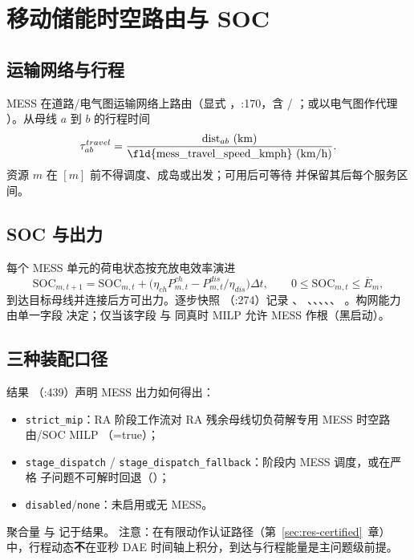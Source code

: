 \section{移动储能时空路由与 SOC}\label{sec:res-mess}

\subsection{运输网络与行程}
MESS 在道路/电气图运输网络上路由（显式 ，:170，含 /
；或以电气图作代理 ）。从母线 $a$
到 $b$ 的行程时间
\begin{equation}
\tau^{travel}_{ab}=\frac{\mathrm{dist}_{ab}\ (\mathrm{km})}{\text{\fld{mess\_travel\_speed\_kmph}}\ (\mathrm{km/h})}.
\end{equation}
资源 $m$ 在 $[m]$ 前不得调度、成岛或出发；可用后可等待
并保留其后每个服务区间。

\subsection{SOC 与出力}
每个 MESS 单元的荷电状态按充放电效率演进
\begin{equation}
\mathrm{SOC}_{m,t+1}=\mathrm{SOC}_{m,t}+\big(\eta_{ch}P^{ch}_{m,t}-P^{dis}_{m,t}/\eta_{dis}\big)\Delta t,
\qquad 0\le\mathrm{SOC}_{m,t}\le \overline{E}_m,
\end{equation}
到达目标母线并连接后方可出力。逐步快照 （:274）记录 、
、、、、、
。构网能力由单一字段  决定；仅当该字段
与  同真时 MILP 允许 MESS 作根（黑启动）。

\subsection{三种装配口径}
结果 （:439）声明 MESS 出力如何得出：
\begin{itemize}
  \item \texttt{strict\_mip}：RA 阶段工作流对 RA 残余母线切负荷解专用 MESS 时空路由/SOC MILP
        （=true）；
  \item \texttt{stage\_dispatch} / \texttt{stage\_dispatch\_fallback}：阶段内 MESS 调度，或在严格
        子问题不可解时回退（）；
  \item \texttt{disabled}/\texttt{none}：未启用或无 MESS。
\end{itemize}
聚合量  与  记于结果。
注意：在有限动作认证路径（第~\ref{sec:res-certified}~章）中，行程动态\textbf{不}在亚秒 DAE
时间轴上积分，到达与行程能量是主问题级前提。

